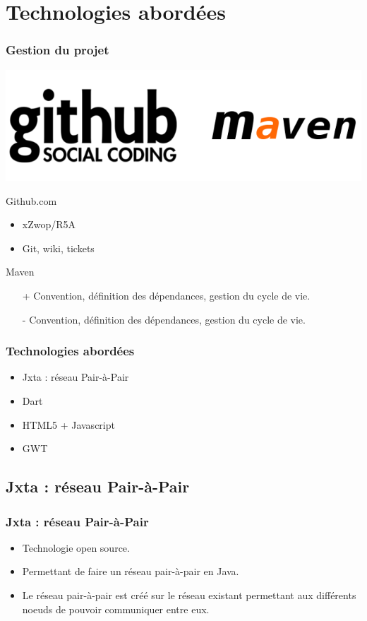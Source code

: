 \section{Technologies abordées}
  \begin{frame}
    \frametitle{Gestion du projet}
    \center
		\includegraphics[scale=.2]{github-maven.png}
    \begin{block}{Github.com}
      \begin{itemize}
        \item xZwop/R5A
        \item Git, wiki, tickets
      \end{itemize}
    \end{block}

    \begin{block}{Maven}
      \begin{itemize}
        \item[+] Convention, définition des dépendances, gestion du cycle de
          vie.
        \item[-] Convention, définition des dépendances, gestion du cycle de
          vie.
      \end{itemize}
    \end{block}
  \end{frame}

  \begin{frame}
    \frametitle{Technologies abordées}
    \begin{itemize}
      \item Jxta : réseau Pair-à-Pair
      \item Dart
      \item HTML5 + Javascript
      \item GWT
    \end{itemize}
  \end{frame}

  \subsection*{Jxta : réseau Pair-à-Pair}
    \begin{frame}
      \frametitle{Jxta : réseau Pair-à-Pair}
      \begin{itemize}
        \item Technologie open source.
        \item Permettant de faire un réseau	pair-à-pair en Java. 
        \item Le  réseau pair-à-pair est créé sur le réseau existant permettant aux différents noeuds de pouvoir communiquer entre eux.\\
      \end{itemize}
    \end{frame}
    
